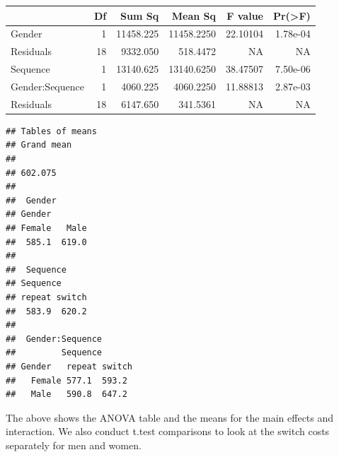 \begin{Shaded}
\begin{Highlighting}[]
\NormalTok{(}\NormalTok{)}
\end{Highlighting}
\end{Shaded}

\begin{tabular}{l|r|r|r|r|r}
\hline
  & Df & Sum Sq & Mean Sq & F value & Pr(>F)\\
\hline
Gender & 1 & 11458.225 & 11458.2250 & 22.10104 & 1.78e-04\\
\hline
Residuals & 18 & 9332.050 & 518.4472 & NA & NA\\
\hline
Sequence & 1 & 13140.625 & 13140.6250 & 38.47507 & 7.50e-06\\
\hline
Gender:Sequence & 1 & 4060.225 & 4060.2250 & 11.88813 & 2.87e-03\\
\hline
Residuals & 18 & 6147.650 & 341.5361 & NA & NA\\
\hline
\end{tabular}

\begin{Shaded}
\begin{Highlighting}[]
\NormalTok{)}
\end{Highlighting}
\end{Shaded}

\begin{verbatim}
## Tables of means
## Grand mean
##         
## 602.075 
## 
##  Gender 
## Gender
## Female   Male 
##  585.1  619.0 
## 
##  Sequence 
## Sequence
## repeat switch 
##  583.9  620.2 
## 
##  Gender:Sequence 
##         Sequence
## Gender   repeat switch
##   Female 577.1  593.2 
##   Male   590.8  647.2
\end{verbatim}

The above shows the ANOVA table and the means for the main effects and
interaction. We also conduct t.test comparisons to look at the switch
costs separately for men and women.

\begin{Shaded}
\begin{Highlighting}[]
\NormalTok{(RT~Sequence,all_data[all_data$Gender==}\NormalTok{,],}\NormalTok{,}\NormalTok{)}
\NormalTok{(RT~Sequence,all_data[all_data$Gender==}\NormalTok{,],}\NormalTok{,}\NormalTok{)}
\end{Highlighting}
\end{Shaded}

